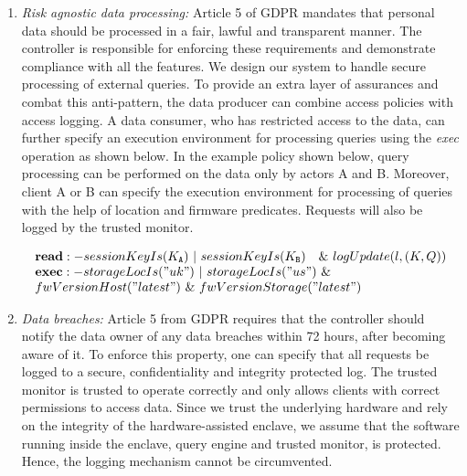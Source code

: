 \begin{enumerate}[wide=0pt]
\item {\em Risk agnostic data processing: }
Article 5 of GDPR mandates that personal data should be processed in a fair, lawful and transparent manner. %
The controller is responsible for enforcing these requirements and demonstrate compliance with all the features. %
We design our system  to handle secure processing of external queries. To provide an extra layer of assurances and combat this anti-pattern, the data producer can combine access policies with access logging. A data consumer, who has restricted access to the data, can further specify an execution environment for processing queries using the \emph{exec} operation as shown below. In the example policy shown below, query processing can be performed on the data only by actors A and B. Moreover, client A or B can specify the execution environment for processing of queries with the help of location and firmware predicates. Requests will also be logged by the trusted monitor. 

\vspace{-4mm}
\[
 \begin{array}{@{}l@{}}
 \textbf{read}:-sessionKeyIs(K_{\tt A})~|~sessionKeyIs(K_{\tt B})
 ~~~\&~logUpdate(l, (K, Q))\\
 \textbf{exec}:-storageLocIs ("uk") ~ | ~ storageLocIs ("us") ~ \& ~\\
 fwVersionHost ("latest") ~ \& ~ fwVersionStorage ("latest")\\
 \end{array}
\]
\vspace{-2mm}

\item {\em Data breaches: }
Article 5 from GDPR requires that the controller should notify the data owner of any data breaches within 72 hours, after becoming aware of it. %
To enforce this property, one can specify that all requests be logged to a secure, confidentiality and integrity protected log. The trusted monitor is trusted to operate correctly and only allows clients with correct permissions to access data. Since we trust the underlying hardware and rely on the integrity of the hardware-assisted enclave, we assume that the software running inside the enclave, query engine and trusted monitor, is protected. Hence, the logging mechanism cannot be circumvented.


\end{enumerate}
